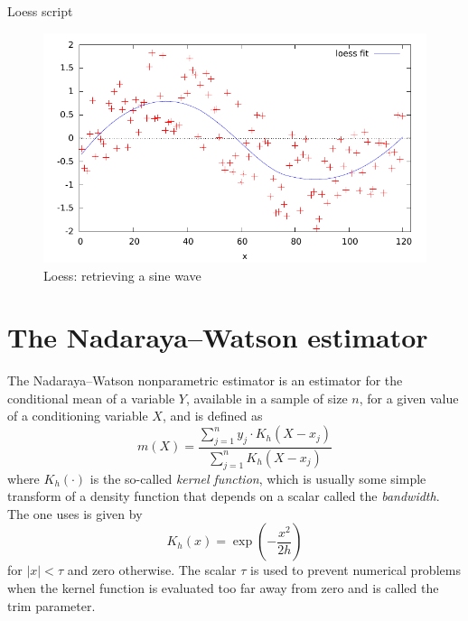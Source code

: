 \begin{script}[htbp]
  \caption{Loess script}
  \label{scr:loess-sine}
\end{script}

\begin{figure}[htbp]
  \centering
  \includegraphics[scale=0.75]{figures/loess-sine}
  \caption{Loess: retrieving a sine wave}
  \label{fig:loess-sine}
\end{figure}

\section{The Nadaraya--Watson estimator}
\label{sec:nadarwat}

The Nadaraya--Watson nonparametric estimator \citep{nadaraya64,
  watson64} is an estimator for the conditional mean of a variable
$Y$, available in a sample of size $n$, for a given value of a
conditioning variable $X$, and is defined as
\[
  m(X) = \frac{ \sum_{j=1}^{n} y_j \cdot K_h(X - x_j)} {\sum_{j=1}^{n} K_h(X - x_j)}
\]
where $K_h(\cdot)$ is the so-called \emph{kernel function}, which is
usually some simple transform of a density function that depends on a
scalar called the \emph{bandwidth}. The one  uses is given
by
\[
  K_h(x) = \exp\left(-\frac{x^2}{2h}\right)
\]
for $|x| < \tau$ and zero otherwise. The scalar $\tau$ is used to
prevent numerical problems when the kernel function is evaluated too
far away from zero and is called the trim parameter.

